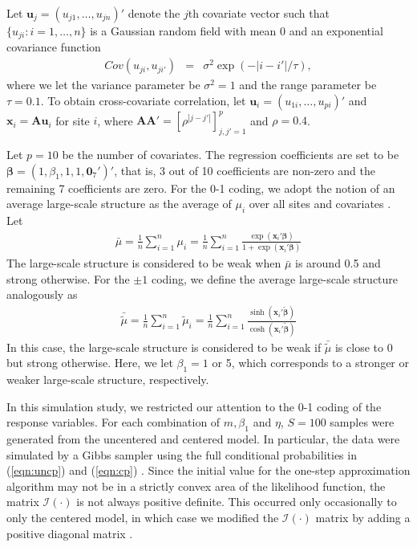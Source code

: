 \documentclass[authoryear,review, 12pt]{elsarticle}
\begin{document}
Let $\bm{u}_j=(u_{j1},\ldots,u_{jn})'$ denote the $j$th covariate vector such that $\{u_{ji}:i=1,\ldots,n\}$ is a Gaussian random field with mean 0 and an exponential covariance function
\begin{eqnarray}
Cov(u_{ji}, u_{ji'})&=&\sigma^2 \exp(-|i-i'|/ \tau), 
\end{eqnarray}
where we let the variance parameter be $\sigma^2=1$ and the range parameter be $\tau=0.1$.  
To obtain cross-covariate correlation, let $\bm{u}_i=(u_{1i},\ldots, u_{pi})'$ and $\bm{x}_i=\bm{A}\bm{u}_i$ for site $i$, where $\bm{A}\bm{A}'=[\rho^{|j-j'|}]^{p}_{j,j'=1}$ and $\rho=0.4$.

Let $p=10$ be the number of covariates.  The regression coefficients are set to be $\bm{\beta}=(1,\beta_1,1,1,\bm{0}_7')'$, that is, 3 out of 10 coefficients are non-zero and the remaining 7 coefficients are zero.  For the 0-1 coding, we adopt the notion of an average large-scale structure as the average of $\mu_i$ over all sites and covariates \citep{carageak09}.  Let
\begin{eqnarray}
\bar{\mu}=\frac{1}{n}\sum_{i=1}^{n}\mu_i=\frac{1}{n}\sum_{i=1}^{n}\frac{\exp({\bm{x}_i'\bm{\beta}})}{1+\exp(\bm{x}_i'\bm{\beta})}
\label{eqn:averlarge1}
\end{eqnarray}
The large-scale structure is considered to be weak when $\bar{\mu}$ is around 0.5 and strong otherwise. For the $\pm 1$ coding, we define the average large-scale structure analogously as
\begin{eqnarray}
\bar{\tilde{\mu}}=\frac{1}{n}\sum_{i=1}^{n}\tilde{\mu}_i=\frac{1}{n}\sum_{i=1}^{n}\frac{\sinh({\bm{x}_i'\tilde{\bm{\beta}}})}{\cosh(\bm{x}_i'\tilde{\bm{\beta}})}
\label{eqn:averlarge2}
\end{eqnarray}
In this case, the large-scale structure is considered to be weak if $\bar{\tilde{\mu}}$ is close to 0 but strong otherwise.  Here, we let $\beta_1=1$ or 5, which corresponds to a stronger or weaker large-scale structure, respectively.  

In this simulation study, we restricted our attention to the 0-1 coding of the response variables.  For each combination of $m, \beta_1$ and $\eta$, $S=100$ samples were generated from the uncentered and centered model. In particular, the data were simulated by a Gibbs sampler using the full conditional probabilities in (\ref{eqn:uncp}) and (\ref{eqn:cp}) \citep{wasserman03}. Since the initial value for the one-step approximation algorithm may not be in a strictly convex area of the likelihood function, the matrix $ \bm{\mathcal{I}}(\cdot)$ is not always positive definite. This occurred only occasionally to only the centered model, in which case we modified the $\bm{\mathcal{I}}(\cdot)$ matrix by adding a positive diagonal matrix \citep{nocedalw00}.   
\end{document}
